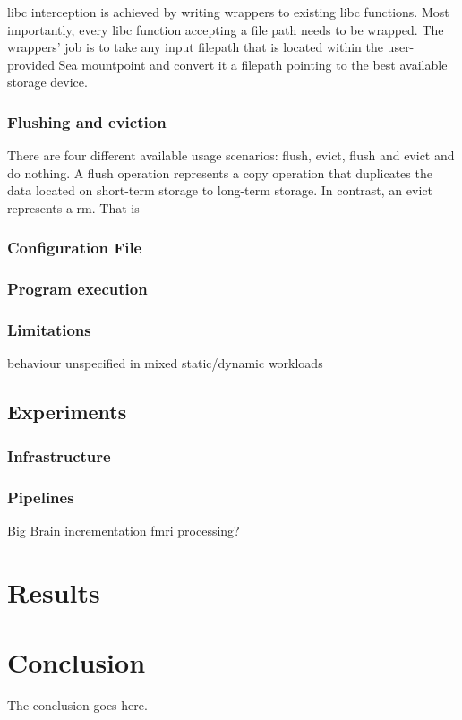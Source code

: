 \documentclass[10pt,journal,compsoc]{IEEEtran}
\begin{document}
libc interception is achieved by writing wrappers to existing libc functions. Most importantly, every
libc function accepting a file path needs to be wrapped. The wrappers' job is to take any input filepath
that is located within the user-provided Sea mountpoint and convert it a filepath pointing to the best available storage device.

\subsubsection{Flushing and eviction}
There are four different available usage scenarios: flush, evict, flush and evict and do nothing.
A flush operation represents a copy operation that duplicates the data located on short-term storage to long-term storage.
In contrast, an evict represents a rm. That is 
\subsubsection{Configuration File}
\subsubsection{Program execution}
\subsubsection{Limitations}
behaviour unspecified in mixed static/dynamic workloads

\subsection{Experiments}
\subsubsection{Infrastructure}
\subsubsection{Pipelines}
Big Brain incrementation
fmri processing?

\section{Results}


\section{Conclusion}
The conclusion goes here.
\end{document}
